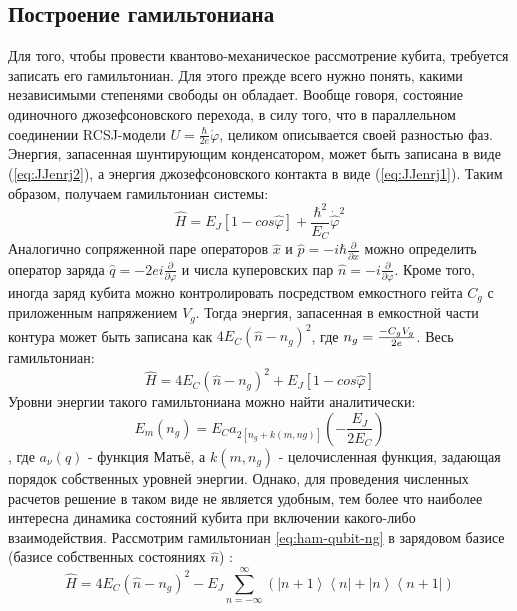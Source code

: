 \documentclass[12pt, twoside]{report}
\numberwithin{equation}{section}
\numberwithin{figure}{section}
\begin{document}
\subsection{Построение гамильтониана}
Для того, чтобы провести квантово-механическое рассмотрение кубита, требуется записать его гамильтониан. Для этого прежде всего нужно понять, какими независимыми степенями свободы он обладает. Вообще говоря, состояние одиночного джозефсоновского перехода, в силу того, что в параллельном соединении RCSJ-модели $U = \frac{\hbar}{2e}\dot\varphi$, целиком описывается своей разностью фаз. Энергия, запасенная шунтирующим конденсатором, может быть записана в виде (\ref{eq:JJenrj2}), а энергия джозефсоновского контакта в виде (\ref{eq:JJenrj1}). Таким образом, получаем гамильтониан системы:
\begin{equation}
\hat{H} = E_J \left[ 1 - cos\hat{\varphi} \right] + \frac{ \hbar^2 }{  E_C } \dot{\hat{\varphi}}^2
\label{eq:ham-qubit}
\end{equation}
Аналогично сопряженной паре операторов $\hat{x}$ и $\hat{p} = -i\hbar\frac{\partial}{\partial x }$ можно определить оператор заряда $\hat{q} = -2e i  \frac{\partial}{\partial \varphi }$ и числа куперовских пар $\hat{n} = - i \frac{\partial}{\partial \varphi }$. Кроме того, иногда заряд кубита можно контролировать посредством емкостного гейта $C_g$ с приложенным напряжением $V_g$. Тогда энергия, запасенная в емкостной части контура может быть записана как $4 E_C (\hat{n} - n_g )^2 $, где $n_g = {-C_g V_g \over 2e}$. Весь гамильтониан:
\begin{equation}
\hat{H} = 4 E_C (\hat{n} - n_g )^2 + E_J \left[1 - cos\hat{\varphi}\right]
\label{eq:ham-qubit-ng}
\end{equation}
Уровни энергии такого гамильтониана можно найти аналитически:
\begin{equation}
E_m(n_g) = E_C a_{2 \left[n_g+k\left(m,ng\right)\right]} (-\frac{E_J}{2 E_C})
\label{eq:ham-qubit-ng-anal}
\end{equation},
где $a_\nu(q)$ - функция Матьё, а $k(m,n_g)$ - целочисленная функция, задающая порядок собственных уровней энергии. Однако, для проведения численных расчетов решение в таком виде не является удобным, тем более что наиболее интересна динамика состояний кубита при включении какого-либо взаимодействия. Рассмотрим гамильтониан \ref{eq:ham-qubit-ng} в зарядовом базисе (базисе собственных состояниях $\hat{n}$) :
\begin{equation}
\hat{H} = 4 E_C \left(\hat{n} - n_g\right)^2  - E_J \sum_{n = -\infty}^{\infty}
\left( 
\left|n+1 \right>\left<n   \right| +
\left|n   \right>\left<n+1 \right|
\right)
\label{eq:ham-qubit-charge-basis}
\end{equation}
\end{document}
